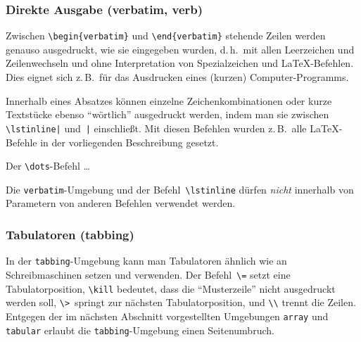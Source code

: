 

\subsubsection{Direkte Ausgabe (verbatim, verb)}
Zwischen \lstinline|\begin{verbatim}| und \lstinline|\end{verbatim}|
stehende Zeilen werden genauso ausgedruckt, wie sie eingegeben
wurden, d.\,h.\ mit allen Leerzeichen und Zeilenwechseln und ohne
Interpretation von Spezialzeichen und \LaTeX-Befehlen.  Dies
eignet sich z.\,B.\ für das Ausdrucken eines (kurzen)
Computer-Programms.

Innerhalb eines Absatzes können einzelne Zeichenkombinationen
oder kurze Textstücke ebenso "`wörtlich"' ausgedruckt
werden, indem man sie zwischen \lstinline.\lstinline|. und~\lstinline.|.
einschließt.
Mit diesen Befehlen wurden z.\,B.\ alle \LaTeX-Befehle in der
vorliegenden Beschreibung gesetzt.

\begin{LTXexample}
Der \lstinline|\dots|-Befehl \dots
\end{LTXexample}
 
Die \texttt{verbatim}-Umgebung und der Befehl~\lstinline|\lstinline|
dürfen \emph{nicht} innerhalb von Parametern von anderen Befehlen
verwendet werden.


 
\subsubsection{Tabulatoren (tabbing)} \label{tabbing}
 
In der \texttt{tabbing}-Umgebung kann man Tabulatoren ähnlich wie
an Schreibmaschinen setzen und verwenden.
Der Befehl~\lstinline|\=| setzt eine Tabulatorposition,
\lstinline|\kill| bedeutet, dass die "`Musterzeile"' nicht ausgedruckt werden
soll,
\lstinline|\>|~springt zur nächsten Tabulatorposition,
und \lstinline|\\| trennt die Zeilen. Entgegen der im nächsten Abschnitt 
vorgestellten Umgebungen \texttt{array} und \texttt{tabular} erlaubt
die \texttt{tabbing}-Umgebung einen Seitenumbruch.

